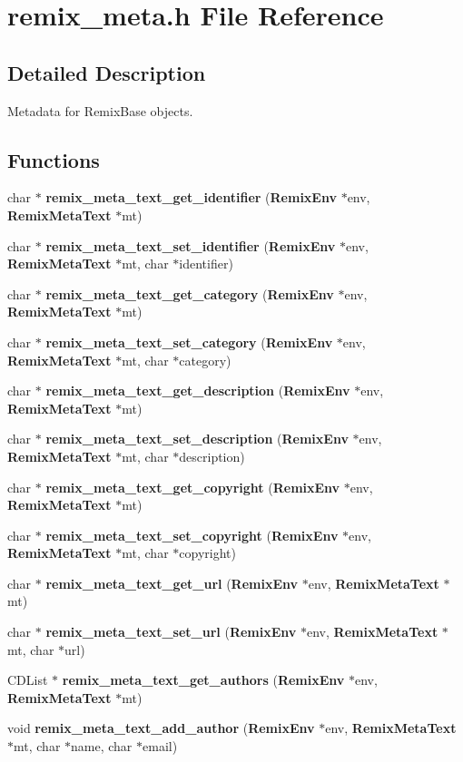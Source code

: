 \section{remix\_\-meta.h File Reference}
\label{remix__meta_8h}


\subsection{Detailed Description}
Metadata for Remix\-Base objects. 



\subsection*{Functions}
\begin{CompactItemize}
\item 
char $\ast$ {\bf remix\_\-meta\_\-text\_\-get\_\-identifier} ({\bf Remix\-Env} $\ast$env, {\bf Remix\-Meta\-Text} $\ast$mt)
\item 
char $\ast$ {\bf remix\_\-meta\_\-text\_\-set\_\-identifier} ({\bf Remix\-Env} $\ast$env, {\bf Remix\-Meta\-Text} $\ast$mt, char $\ast$identifier)
\item 
char $\ast$ {\bf remix\_\-meta\_\-text\_\-get\_\-category} ({\bf Remix\-Env} $\ast$env, {\bf Remix\-Meta\-Text} $\ast$mt)
\item 
char $\ast$ {\bf remix\_\-meta\_\-text\_\-set\_\-category} ({\bf Remix\-Env} $\ast$env, {\bf Remix\-Meta\-Text} $\ast$mt, char $\ast$category)
\item 
char $\ast$ {\bf remix\_\-meta\_\-text\_\-get\_\-description} ({\bf Remix\-Env} $\ast$env, {\bf Remix\-Meta\-Text} $\ast$mt)
\item 
char $\ast$ {\bf remix\_\-meta\_\-text\_\-set\_\-description} ({\bf Remix\-Env} $\ast$env, {\bf Remix\-Meta\-Text} $\ast$mt, char $\ast$description)
\item 
char $\ast$ {\bf remix\_\-meta\_\-text\_\-get\_\-copyright} ({\bf Remix\-Env} $\ast$env, {\bf Remix\-Meta\-Text} $\ast$mt)
\item 
char $\ast$ {\bf remix\_\-meta\_\-text\_\-set\_\-copyright} ({\bf Remix\-Env} $\ast$env, {\bf Remix\-Meta\-Text} $\ast$mt, char $\ast$copyright)
\item 
char $\ast$ {\bf remix\_\-meta\_\-text\_\-get\_\-url} ({\bf Remix\-Env} $\ast$env, {\bf Remix\-Meta\-Text} $\ast$mt)
\item 
char $\ast$ {\bf remix\_\-meta\_\-text\_\-set\_\-url} ({\bf Remix\-Env} $\ast$env, {\bf Remix\-Meta\-Text} $\ast$mt, char $\ast$url)
\item 
CDList $\ast$ {\bf remix\_\-meta\_\-text\_\-get\_\-authors} ({\bf Remix\-Env} $\ast$env, {\bf Remix\-Meta\-Text} $\ast$mt)
\item 
void {\bf remix\_\-meta\_\-text\_\-add\_\-author} ({\bf Remix\-Env} $\ast$env, {\bf Remix\-Meta\-Text} $\ast$mt, char $\ast$name, char $\ast$email)
\end{CompactItemize}


